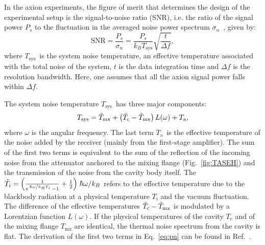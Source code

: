 \documentclass[%
 reprint,prl, %
superscriptaddress,
nobibnotes,
 amsmath,amssymb,
 aps,
]{revtex4-2}
\newcommand{\tsys}{\ensuremath{T_\text{sys}}}
\newcommand{\ta}{\ensuremath{T_\text{a}}}
\newcommand{\noise}{\ensuremath{1.9 - 2.2}}
\begin{document}
In the axion experiments, the figure of merit that determines the design of 
the experimental setup is the signal-to-noise ratio
(SNR), i.e. the ratio of the signal power $P_s$ to the fluctuation in 
the averaged noise power spectrum $\sigma_n$~\cite{Dicke}, given by:  
\begin{equation}
   \text{SNR}  =  \frac{P_s}{\sigma_n}=  \frac{P_s}{k_B\tsys}\sqrt{\frac{t}{\Delta f}},
 \label{eq:SNR}
\end{equation}  
where \tsys\ is the system noise temperature, an effective 
temperature associated with the total noise of the system, 
$t$ is the data integration time and $\Delta f$ is the resolution bandwidth. 
Here, one assumes that all the axion signal power falls within $\Delta f$.  


The system noise temperature \tsys\ has three major components:
\begin{equation}
 \tsys = \Tilde{T}_\text{mx} + \left(\Tilde{T}_\text{c}-\Tilde{T}_\text{mx}\right)L(\omega) + \ta,
\label{eq:pn}
\end{equation}
where $\omega$ is the angular frequency.
The last term \ta\ is the effective temperature of the
noise added by the receiver (mainly from the first-stage amplifier).
The sum of the first two terms is equivalent 
to the sum of the reflection of the incoming noise from
the attenuator anchored to the mixing flange (Fig.~\ref{fig:TASEH}) 
and the transmission of the noise from the cavity body itself.
The
$\Tilde{T}_i=\left(\frac{1}{e^{\left.\hbar\omega\middle/k_BT_i\right.}-1} + \frac{1}{2}\right)\left. \hbar\omega\middle/k_B\right.$ refers to
the effective temperature due to
the blackbody radiation at a physical temperature $T_i$ and
the vacuum fluctuation.
The difference
of the effective temperatures $\Tilde{T}_\text{c}-\Tilde{T}_\text{mx}$ is
modulated by a Lorentzian function $L(\omega)$. 
If the physical temperatures of the cavity $T_\text{c}$ and of 
the mixing flange $T_\text{mx}$ 
are identical, the thermal noise spectrum from the cavity is flat. 
The derivation of the first two terms in Eq.~\eqref{eq:pn} can be found in
Ref.~\cite{TASEHAnalysis}. 
%
%
\end{document}
